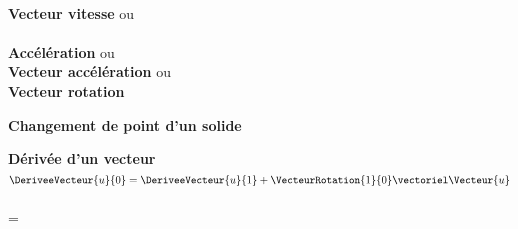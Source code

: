 \documentclass[b,e,cours]{D:/hubiC/GitHub/test_Baggio/paquets/classe_kara}
\begin{document}
\begin{frame}
\\

\textbf{Vecteur vitesse}\newline
{} ou \\

\\


\textbf{Accélération}\newline
{} ou 
\\

\textbf{Vecteur accélération}\newline
{} ou 
\\


\textbf{Vecteur rotation}\newline
{}

\textbf{Changement de point d'un solide}\newline
{}\\

\textbf{Dérivée d'un vecteur}\newline
{}\\

$\DeriveeVecteur{u}{0}=\DeriveeVecteur{u}{1}+\VecteurRotation{1}{0}\vectoriel \Vecteur{u}$\\

\\


=

\end{frame}
%
%
%

%
%
\end{document}
